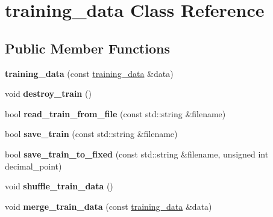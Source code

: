\hypertarget{class_f_a_n_n_1_1training__data}{\section{training\-\_\-data Class Reference}
\label{class_f_a_n_n_1_1training__data}
}
\subsection*{Public Member Functions}
\begin{DoxyCompactItemize}
\item 
\hypertarget{class_f_a_n_n_1_1training__data_ad462436963bb679bd290ba279cf5f597}{{\bfseries training\-\_\-data} (const \hyperlink{class_f_a_n_n_1_1training__data}{training\-\_\-data} \&data)}\label{class_f_a_n_n_1_1training__data_ad462436963bb679bd290ba279cf5f597}

\item 
\hypertarget{class_f_a_n_n_1_1training__data_a8b3a699d8b0bf1e5852b4989a75af9c2}{void {\bfseries destroy\-\_\-train} ()}\label{class_f_a_n_n_1_1training__data_a8b3a699d8b0bf1e5852b4989a75af9c2}

\item 
\hypertarget{class_f_a_n_n_1_1training__data_ae283ed6d29dc0f86f969acd0bcfaafda}{bool {\bfseries read\-\_\-train\-\_\-from\-\_\-file} (const std\-::string \&filename)}\label{class_f_a_n_n_1_1training__data_ae283ed6d29dc0f86f969acd0bcfaafda}

\item 
\hypertarget{class_f_a_n_n_1_1training__data_ad888d1ae5ce48e8b16f3f33ec8631d26}{bool {\bfseries save\-\_\-train} (const std\-::string \&filename)}\label{class_f_a_n_n_1_1training__data_ad888d1ae5ce48e8b16f3f33ec8631d26}

\item 
\hypertarget{class_f_a_n_n_1_1training__data_af7cea779e5cd67dce012ee8ab25cab58}{bool {\bfseries save\-\_\-train\-\_\-to\-\_\-fixed} (const std\-::string \&filename, unsigned int decimal\-\_\-point)}\label{class_f_a_n_n_1_1training__data_af7cea779e5cd67dce012ee8ab25cab58}

\item 
\hypertarget{class_f_a_n_n_1_1training__data_ad73e38b0a91693f3b6d6f0c00992b760}{void {\bfseries shuffle\-\_\-train\-\_\-data} ()}\label{class_f_a_n_n_1_1training__data_ad73e38b0a91693f3b6d6f0c00992b760}

\item 
\hypertarget{class_f_a_n_n_1_1training__data_a681a3f654e0c8df8d626c4070ad602c4}{void {\bfseries merge\-\_\-train\-\_\-data} (const \hyperlink{class_f_a_n_n_1_1training__data}{training\-\_\-data} \&data)}\label{class_f_a_n_n_1_1training__data_a681a3f654e0c8df8d626c4070ad602c4}


\end{DoxyCompactItemize}
